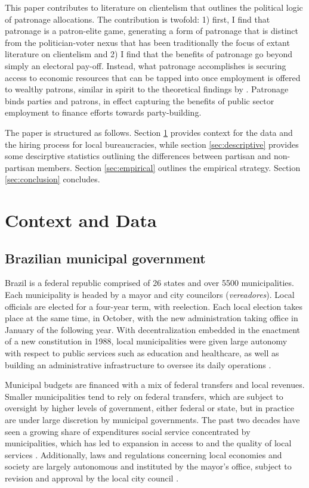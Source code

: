 \documentclass[12pt,a4paper]{article}
\begin{document}
This paper contributes to literature on clientelism that outlines the political logic of patronage allocations. The contribution is twofold: 1) first, I find that patronage is a patron-elite game, generating a form of patronage that is distinct from the politician-voter nexus that has been traditionally the focus of extant literature on clientelism \citet{stokes2013brokers, diaz2016political} and 2) I find that the benefits of patronage go beyond simply an electoral pay-off. Instead, what patronage accomplishes is securing access to economic resources that can be tapped into once employment is offered to wealthy patrons, similar in spirit to the theoretical findings by \citet{robinson2013political}. Patronage binds parties and patrons, in effect capturing the benefits of public sector employment to finance efforts towards party-building.

The paper is structured as follows. Section \ref{sec:context} provides context for the data and the hiring process for local bureaucracies, while section \ref{sec:descriptive} provides some descirptive statistics outlining the differences between partisan and non-partisan members. Section \ref{sec:empirical} outlines the empirical strategy. Section \ref{sec:conclusion} concludes.

\section{Context and Data}
\label{sec:context}

\subsection{Brazilian municipal government}

Brazil is a federal republic comprised of 26 states and over 5500 municipalities. Each municipality is headed by a mayor and city councilors (\emph{vereadores}). Local officials are elected for a four-year term, with reelection. Each local election takes place at the same time, in October, with the new administration taking office in January of the following year. With decentralization embedded in the enactment of a new constitution in 1988, local municipalities were given large autonomy with respect to public services such as education and healthcare, as well as building an administrative infrastructure to oversee its daily operations \citep{souza2017modernizaccao}. 

Municipal budgets are financed with a mix of federal transfers and local revenues. Smaller municipalities tend to rely on federal transfers, which are subject to oversight by higher levels of government, either federal or state, but in practice are under large discretion by municipal governments. The past two decades have seen a growing share of expenditures social service concentrated by municipalities, which has led to expansion in access to and the quality of local services \citep{arretche2015trajetorias}. Additionally, laws and regulations concerning local economies and society are largely autonomous and instituted by the mayor's office, subject to revision and approval by the local city council \citep{brelaz2013processo}.
\end{document}

